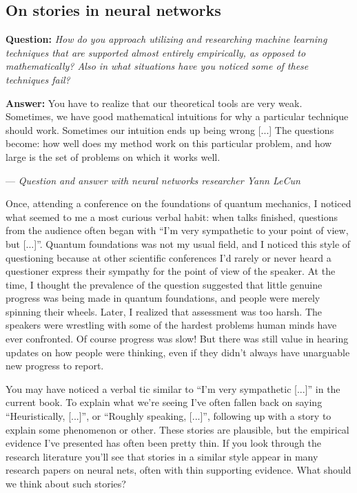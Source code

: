 \documentclass[a4paper,twoside,10pt]{book}
\begin{document}
\subsection*{On stories in neural networks}
\hangindent=1cm\textbf{Question:} \textit{How do you approach utilizing and researching machine learning techniques that are supported almost entirely empirically, as opposed to mathematically? Also in what situations have you noticed some of these techniques fail?}

\hangindent=1cm\textbf{Answer:} You have to realize that our theoretical tools are very weak. Sometimes, we have good mathematical intuitions for why a particular technique should work. Sometimes our intuition ends up being wrong [...] The questions become: how well does my method work on this particular problem, and how large is the set of problems on which it works well.

\hangindent=1cm--- \textit{Question and answer with neural networks researcher Yann LeCun}

\noindent Once, attending a conference on the foundations of quantum mechanics, I noticed what seemed to me a most curious verbal habit: when talks finished, questions from the audience often began with ``I'm very sympathetic to your point of view, but [...]''. Quantum foundations was not my usual field, and I noticed this style of questioning because at other scientific conferences I'd rarely or never heard a questioner express their sympathy for the point of view of the speaker. At the time, I thought the prevalence of the question suggested that little genuine progress was being made in quantum foundations, and people were merely spinning their wheels. Later, I realized that assessment was too harsh. The speakers were wrestling with some of the hardest problems human minds have ever confronted. Of course progress was slow! But there was still value in hearing updates on how people were thinking, even if they didn't always have unarguable new progress to report.

You may have noticed a verbal tic similar to ``I'm very sympathetic [...]'' in the current book. To explain what we're seeing I've often fallen back on saying ``Heuristically, [...]'', or ``Roughly speaking, [...]'', following up with a story to explain some phenomenon or other. These stories are plausible, but the empirical evidence I've presented has often been pretty thin. If you look through the research literature you'll see that stories in a similar style appear in many research papers on neural nets, often with thin supporting evidence. What should we think about such stories?
\end{document}
